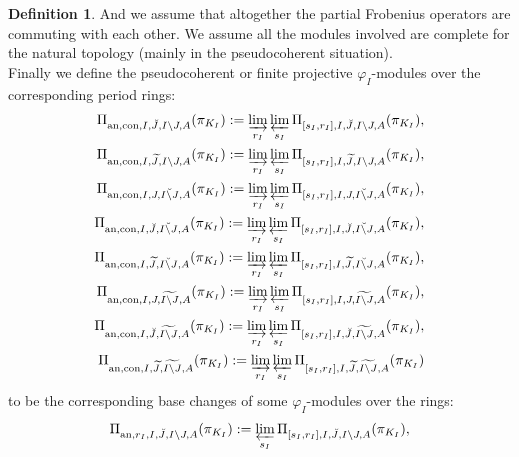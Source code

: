 \documentclass[12pt]{amsart}
\theoremstyle{definition}
\newtheorem{definition}[theorem]{Definition}
\numberwithin{equation}{section}
\begin{document}
\begin{definition}
And we assume that altogether the partial Frobenius operators are commuting with each other. We assume all the modules involved are complete for the natural topology (mainly in the pseudocoherent situation).\\
\noindent Finally we define the pseudocoherent or finite projective $\varphi_I$-modules over the corresponding period rings:
\begin{align}
\Pi_{\mathrm{an},\mathrm{con},I,\breve{J},I\backslash J,A}(\pi_{K_I}):=\varinjlim_{r_I}\varprojlim_{s_I}\Pi_{[s_I,r_I],I,\breve{J},I\backslash J,A}(\pi_{K_I}),\\	
\Pi_{\mathrm{an},\mathrm{con},I,\widetilde{J},I\backslash J,A}(\pi_{K_I}):=\varinjlim_{r_I}\varprojlim_{s_I} \Pi_{[s_I,r_I],I,\widetilde{J},I\backslash J,A}(\pi_{K_I}),\\
\Pi_{\mathrm{an},\mathrm{con},I,J,\breve{I\backslash J},A}(\pi_{K_I}):=\varinjlim_{r_I}\varprojlim_{s_I}\Pi_{[s_I,r_I],I,J,\breve{I\backslash J},A}(\pi_{K_I}),\\	
\Pi_{\mathrm{an},\mathrm{con},I,\breve{J},\breve{I\backslash J},A}(\pi_{K_I}):=\varinjlim_{r_I}\varprojlim_{s_I} \Pi_{[s_I,r_I],I,\breve{J},\breve{I\backslash J},A}(\pi_{K_I}),\\
\Pi_{\mathrm{an},\mathrm{con},I,\widetilde{J},\breve{I\backslash J},A}(\pi_{K_I}):=\varinjlim_{r_I}\varprojlim_{s_I} \Pi_{[s_I,r_I],I,\widetilde{J},\breve{I\backslash J},A}(\pi_{K_I}),\\
\Pi_{\mathrm{an},\mathrm{con},I,J,\widetilde{I\backslash J},A}(\pi_{K_I}):=\varinjlim_{r_I}\varprojlim_{s_I} \Pi_{[s_I,r_I],I,J,\widetilde{I\backslash J},A}(\pi_{K_I}),\\	
\Pi_{\mathrm{an},\mathrm{con},I,\breve{J},\widetilde{I\backslash J},A}(\pi_{K_I}):=\varinjlim_{r_I}\varprojlim_{s_I} \Pi_{[s_I,r_I],I,\breve{J},\widetilde{I\backslash J},A}(\pi_{K_I}),\\	
\Pi_{\mathrm{an},\mathrm{con},I,\widetilde{J},\widetilde{I\backslash J},A}(\pi_{K_I}):=\varinjlim_{r_I}\varprojlim_{s_I} \Pi_{[s_I,r_I],I,\widetilde{J},\widetilde{I\backslash J},A}(\pi_{K_I})
\end{align}
to be the corresponding base changes of some $\varphi_I$-modules over the rings:
\begin{align}
\Pi_{\mathrm{an},r_I,I,\breve{J},I\backslash J,A}(\pi_{K_I}):=\varprojlim_{s_I}\Pi_{[s_I,r_I],I,\breve{J},I\backslash J,A}(\pi_{K_I}),\\	

\end{align}
\end{definition}
\end{document}
